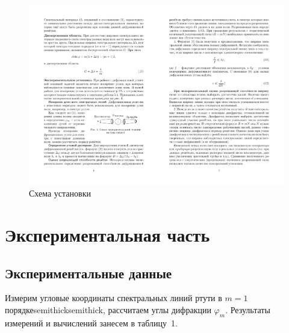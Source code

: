 \documentclass[a4paper,12pt]{article}
\begin{document}
\begin{figure}[h!]
    \centering
    \includegraphics[scale=2]{inst.pdf}
    \caption{Схема установки}
\end{figure}

\section{Экспериментальная часть}
\subsection{Экспериментальные данные}
\begin{flushleft}
    \hspace*{2.5 mm}
    Измерим угловые координаты спектральных линий ртути в $ m = 1 $ 
    порядкеsemithicksemithick, рассчитаем углы дифракции $\varphi_m$. 
    Результаты измерений и вычислений занесем в 
    таблицу~1.
\end{flushleft}
\end{document}

